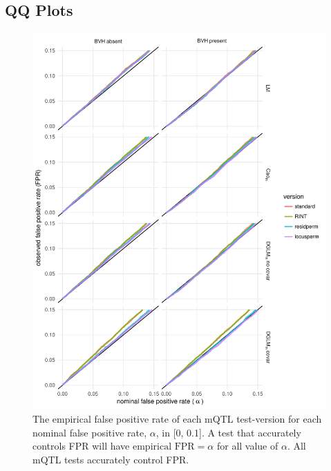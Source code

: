 \subsection{QQ Plots}
  \begin{figure}[h!]
      \centering
      \includegraphics[width = 0.9\linewidth]{images/mqtl_null_qqs.pdf}
      \caption[
        The empirical false positive rate of each mQTL test-version for each nominal false positive rate, $\alpha$, in {[}0, 0.1{]}.
      ]
      {
        The empirical false positive rate of each mQTL test-version for each nominal false positive rate, $\alpha$, in {[}0, 0.1{]}.
        A test that accurately controls FPR will have $\text{empirical FPR}=\alpha$ for all value of $\alpha$.
        All mQTL tests accurately control FPR.
      }
      \label{fig:mqtl_tests_null_qqs}
  \end{figure}

